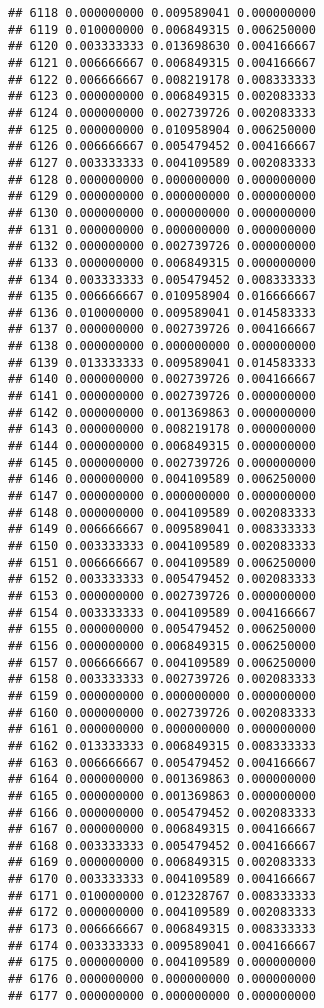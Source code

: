 \documentclass[
]{article}
\begin{document}
\begin{verbatim}
## 6118 0.000000000 0.009589041 0.000000000
## 6119 0.010000000 0.006849315 0.006250000
## 6120 0.003333333 0.013698630 0.004166667
## 6121 0.006666667 0.006849315 0.004166667
## 6122 0.006666667 0.008219178 0.008333333
## 6123 0.000000000 0.006849315 0.002083333
## 6124 0.000000000 0.002739726 0.002083333
## 6125 0.000000000 0.010958904 0.006250000
## 6126 0.006666667 0.005479452 0.004166667
## 6127 0.003333333 0.004109589 0.002083333
## 6128 0.000000000 0.000000000 0.000000000
## 6129 0.000000000 0.000000000 0.000000000
## 6130 0.000000000 0.000000000 0.000000000
## 6131 0.000000000 0.000000000 0.000000000
## 6132 0.000000000 0.002739726 0.000000000
## 6133 0.000000000 0.006849315 0.000000000
## 6134 0.003333333 0.005479452 0.008333333
## 6135 0.006666667 0.010958904 0.016666667
## 6136 0.010000000 0.009589041 0.014583333
## 6137 0.000000000 0.002739726 0.004166667
## 6138 0.000000000 0.000000000 0.000000000
## 6139 0.013333333 0.009589041 0.014583333
## 6140 0.000000000 0.002739726 0.004166667
## 6141 0.000000000 0.002739726 0.000000000
## 6142 0.000000000 0.001369863 0.000000000
## 6143 0.000000000 0.008219178 0.000000000
## 6144 0.000000000 0.006849315 0.000000000
## 6145 0.000000000 0.002739726 0.000000000
## 6146 0.000000000 0.004109589 0.006250000
## 6147 0.000000000 0.000000000 0.000000000
## 6148 0.000000000 0.004109589 0.002083333
## 6149 0.006666667 0.009589041 0.008333333
## 6150 0.003333333 0.004109589 0.002083333
## 6151 0.006666667 0.004109589 0.006250000
## 6152 0.003333333 0.005479452 0.002083333
## 6153 0.000000000 0.002739726 0.000000000
## 6154 0.003333333 0.004109589 0.004166667
## 6155 0.000000000 0.005479452 0.006250000
## 6156 0.000000000 0.006849315 0.006250000
## 6157 0.006666667 0.004109589 0.006250000
## 6158 0.003333333 0.002739726 0.002083333
## 6159 0.000000000 0.000000000 0.000000000
## 6160 0.000000000 0.002739726 0.002083333
## 6161 0.000000000 0.000000000 0.000000000
## 6162 0.013333333 0.006849315 0.008333333
## 6163 0.006666667 0.005479452 0.004166667
## 6164 0.000000000 0.001369863 0.000000000
## 6165 0.000000000 0.001369863 0.000000000
## 6166 0.000000000 0.005479452 0.002083333
## 6167 0.000000000 0.006849315 0.004166667
## 6168 0.003333333 0.005479452 0.004166667
## 6169 0.000000000 0.006849315 0.002083333
## 6170 0.003333333 0.004109589 0.004166667
## 6171 0.010000000 0.012328767 0.008333333
## 6172 0.000000000 0.004109589 0.002083333
## 6173 0.006666667 0.006849315 0.008333333
## 6174 0.003333333 0.009589041 0.004166667
## 6175 0.000000000 0.004109589 0.000000000
## 6176 0.000000000 0.000000000 0.000000000
## 6177 0.000000000 0.000000000 0.000000000

\end{verbatim}
\end{document}
